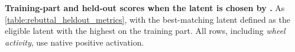 \begin{table}[!t]
    \centering
    {\small\setlength{\tabcolsep}{3pt}\renewcommand{\arraystretch}{1.12}
    }
    \caption{\textbf{Training-part and held-out scores when the latent is chosen by .} As \autoref{table:rebuttal_heldout_metrics}, with the best-matching latent defined as the eligible latent with the highest  on the training part. All rows, including \textit{wheel activity}, use native positive activation.}
    \label{table:rebuttal_heldout_metrics_sel}
\end{table}

